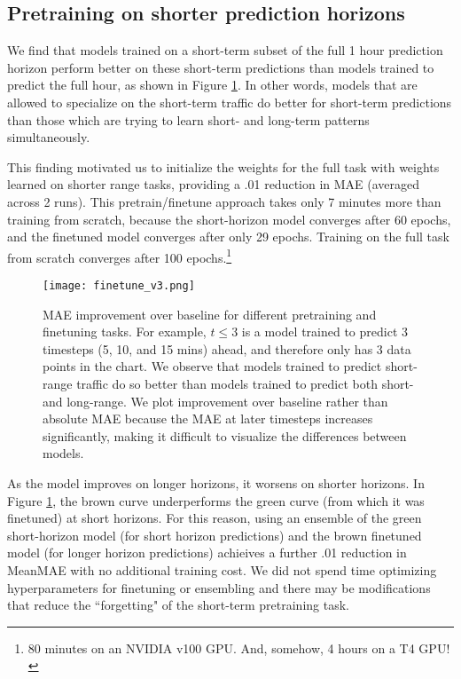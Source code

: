 \documentclass[10pt]{article}
\begin{document}
\subsection{Pretraining on shorter prediction horizons}

We find that models trained on a short-term subset of the full 1 hour prediction horizon perform better on these short-term predictions than models trained to predict the full hour, as shown in Figure \ref{transfer_learning}. In other words, models that are allowed to specialize on the short-term traffic do better for short-term predictions than those which are trying to learn short- and long-term patterns simultaneously.

This finding motivated us to initialize the weights for the full task with weights learned on shorter range tasks, providing a .01 reduction in MAE (averaged across 2 runs). This pretrain/finetune approach takes only 7 minutes more than training from scratch, because the short-horizon model converges after 60 epochs, and the finetuned model converges after only 29 epochs. Training on the full task from scratch converges after 100 epochs.\footnote{80 minutes on an NVIDIA v100 GPU. And, somehow, 4 hours on a T4 GPU!}

\begin{figure}[h]
    \centering
\texttt{[image: finetune\_v3.png]}
\caption{MAE improvement over baseline for different pretraining and finetuning tasks. For example, $t \leq 3$ is a model trained to predict 3 timesteps (5, 10, and 15 mins) ahead, and therefore only has 3 data points in the chart. We observe that models trained to predict short-range traffic do so better than models trained to predict both short- and long-range. We plot improvement over baseline rather than absolute MAE because the MAE at later timesteps increases significantly, making it difficult to visualize the differences between models.}
\label{transfer_learning}
\end{figure}

As the model improves on longer horizons, it worsens on shorter horizons. In Figure \ref{transfer_learning}, the brown curve underperforms the green curve (from which it was finetuned) at short horizons. For this reason, using an ensemble of the green short-horizon model (for short horizon predictions) and the brown finetuned model (for longer horizon predictions) achieives a further .01 reduction in MeanMAE with no additional training cost. We did not spend time optimizing hyperparameters for finetuning or ensembling and there may be modifications that reduce the ``forgetting" of the short-term pretraining task.
\end{document}
